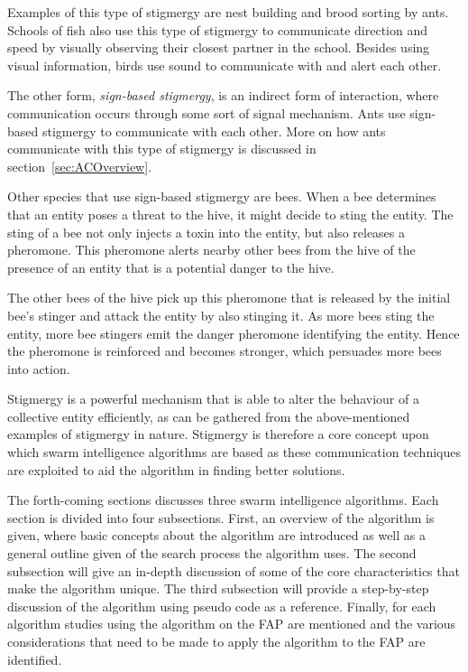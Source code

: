 Examples of this type of stigmergy are nest building and brood sorting by ants\cite{CompuIntelligenceIntro}. Schools of fish also use this type of stigmergy to communicate direction and speed by visually observing their closest partner in the school. Besides using visual information, birds use sound to communicate with and alert each other\cite{SwarmArt}.

The other form, \emph{sign-based stigmergy}, is an indirect form of interaction, where communication occurs through some sort of signal mechanism\cite{CompuIntelligenceIntro}. Ants use sign-based stigmergy to communicate with each other. More on how ants communicate with this type of stigmergy is discussed in section~\ref{sec:ACOverview}.

Other species that use sign-based stigmergy are bees\cite{stigmergicoptimization}. When a bee determines that an entity poses a threat to the hive, it might decide to sting the entity. The sting of a bee not only injects a toxin into the entity, but also releases a pheromone\cite{stigmergicoptimization}. This pheromone alerts nearby other bees from the hive of the presence of an entity that is a potential danger to the hive\cite{stigmergicoptimization}. 

The other bees of the hive pick up this pheromone that is released by the initial bee's stinger and attack the entity by also stinging it\cite{stigmergicoptimization}. As more bees sting the entity, more bee stingers emit the danger pheromone identifying the entity\cite{stigmergicoptimization}. Hence the pheromone is reinforced and becomes stronger, which persuades more bees into action\cite{stigmergicoptimization}.

Stigmergy is a powerful mechanism that is able to alter the behaviour of a collective entity efficiently, as can be gathered from the above-mentioned examples of stigmergy in nature\cite{AntsAndStigmergy,CompuIntelligenceIntro,AntIntroTrends}. Stigmergy is therefore a core concept upon which swarm intelligence algorithms are based as these communication techniques are exploited to aid the algorithm in finding better solutions\cite{AntsAndStigmergy,CompuIntelligenceIntro,AntIntroTrends}.

The forth-coming sections discusses three swarm intelligence algorithms. Each section is divided into four subsections. First, an overview of the algorithm is given, where basic concepts about the algorithm are introduced as well as a general outline given of the search process the algorithm uses. 
The second subsection will give an in-depth discussion of some of the core characteristics that make the algorithm unique. 
The third subsection will provide a step-by-step discussion of the algorithm using pseudo code as a reference. Finally, for each algorithm studies using the algorithm on the \gls{FAP} are mentioned and the various considerations that need to be made to apply the algorithm to the \gls{FAP} are identified.

